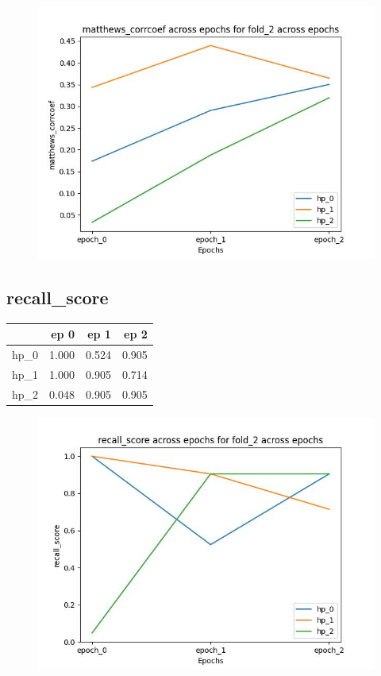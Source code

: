 \documentclass{article}
\begin{document}
\begin{figure}[H]
\includegraphics[scale = 0.75]{fold_2/matthews_corrcoef}
\end{figure}
\subsection{recall\_score}
\begin{tabular}{lrrr}
\toprule
{} &   ep 0 &   ep 1 &   ep 2 \\
\midrule
hp\_0 &  1.000 &  0.524 &  0.905 \\
hp\_1 &  1.000 &  0.905 &  0.714 \\
hp\_2 &  0.048 &  0.905 &  0.905 \\
\bottomrule
\end{tabular}

\begin{figure}[H]
\includegraphics[scale = 0.75]{fold_2/recall_score}
\end{figure}
\end{document}
